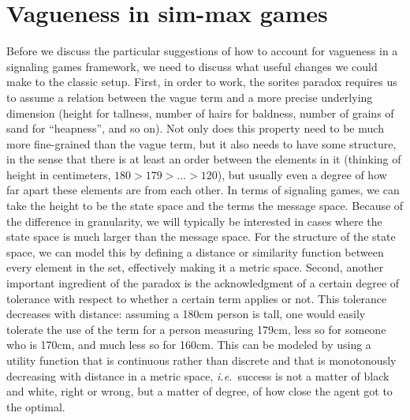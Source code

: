\documentclass[a4paper]{article}
\begin{document}
%


\section{Vagueness in sim-max games}
\label{sec:sim-max-vagueness}

Before we discuss the particular suggestions of how to account for vagueness in a signaling
games framework, we need to discuss what useful changes we could make to the classic setup.
First, in order to work, the sorites paradox requires us to assume a relation between the vague term and a more precise underlying dimension (height for tallness, number of hairs for baldness, number of grains of sand for ``heapness'', and so on).
Not only does this property need to be much more fine-grained than the vague term, but it also needs to have some structure, in the sense that there is at least an order between the elements in it (thinking of height in centimeters, $180 > 179 > \ldots > 120$), but usually even a degree of how far apart these elements are from each other.
In terms of signaling games, we can take the height to be the state space and the terms the message space.
Because of the difference in granularity, we will typically be interested in cases where the state space is much larger than the message space.
For the structure of the state space, we can model this by defining a distance or similarity function between every element in the set, effectively making it a metric space.
Second, another important ingredient of the paradox is the acknowledgment of a certain degree of tolerance with respect to whether a certain term applies or not.
This tolerance decreases with distance: assuming a 180cm person is tall, one would easily tolerate the use of the term for a person measuring 179cm, less so for someone who is 170cm, and much less so for 160cm.
This can be modeled by using a utility function that is continuous rather than discrete and that is monotonously decreasing with distance in a metric space, \emph{i.e.}~success is not a matter of black and white, right or wrong, but a matter of degree, of how close the agent got to the optimal.
\end{document}
